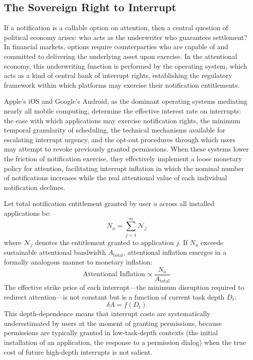 \documentclass[12pt]{article}
\begin{document}
\subsection{The Sovereign Right to Interrupt}

If a notification is a callable option on attention, then a central question of political economy arises: who acts as the underwriter who guarantees settlement? In financial markets, options require counterparties who are capable of and committed to delivering the underlying asset upon exercise. In the attentional economy, this underwriting function is performed by the operating system, which acts as a kind of central bank of interrupt rights, establishing the regulatory framework within which platforms may exercise their notification entitlements.

Apple's iOS and Google's Android, as the dominant operating systems mediating nearly all mobile computing, determine the effective interest rate on interrupts: the ease with which applications may exercise notification rights, the minimum temporal granularity of scheduling, the technical mechanisms available for escalating interrupt urgency, and the opt-out procedures through which users may attempt to revoke previously granted permissions. When these systems lower the friction of notification exercise, they effectively implement a loose monetary policy for attention, facilitating interrupt inflation in which the nominal number of notifications increases while the real attentional value of each individual notification declines.

Let total notification entitlement granted by user $u$ across all installed applications be:
\[
N_u = \sum_{j=1}^{m} \mathcal{N}_j
\]
where $\mathcal{N}_j$ denotes the entitlement granted to application $j$. If $N_u$ exceeds sustainable attentional bandwidth $A_{\text{total}}$, attentional inflation emerges in a formally analogous manner to monetary inflation:
\[
\text{Attentional Inflation} \propto \frac{N_u}{A_{\text{total}}}
\]
The effective strike price of each interrupt---the minimum disruption required to redirect attention---is not constant but is a function of current task depth $D_t$:
\[
\delta A = f(D_t)
\]
This depth-dependence means that interrupt costs are systematically underestimated by users at the moment of granting permissions, because permissions are typically granted in low-task-depth contexts (the initial installation of an application, the response to a permission dialog) when the true cost of future high-depth interrupts is not salient.
\end{document}
